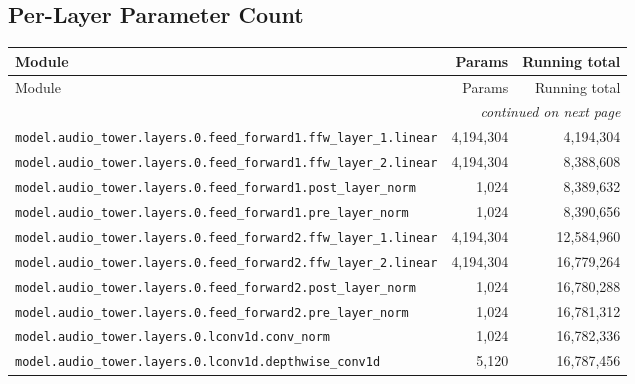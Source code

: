 \documentclass[10pt,a4paper]{article}
\theoremstyle{definition}
\begin{document}
\begin{appendices}
\section{Per-Layer Parameter Count}
\begin{longtable}{p{9.5cm}rr}
\toprule
Module & Params & Running total \\
\midrule
\endfirsthead
\toprule
Module & Params & Running total \\
\midrule
\endhead
\midrule \multicolumn{3}{r}{\textit{continued on next page}} \\
\endfoot
\bottomrule
\endlastfoot
\texttt{model.\allowbreak{}audio\_tower.\allowbreak{}layers.\allowbreak{}0.\allowbreak{}feed\_forward1.\allowbreak{}ffw\_layer\_1.\allowbreak{}linear} & 4,194,304 & 4,194,304 \\
\texttt{model.\allowbreak{}audio\_tower.\allowbreak{}layers.\allowbreak{}0.\allowbreak{}feed\_forward1.\allowbreak{}ffw\_layer\_2.\allowbreak{}linear} & 4,194,304 & 8,388,608 \\
\texttt{model.\allowbreak{}audio\_tower.\allowbreak{}layers.\allowbreak{}0.\allowbreak{}feed\_forward1.\allowbreak{}post\_layer\_norm} & 1,024 & 8,389,632 \\
\texttt{model.\allowbreak{}audio\_tower.\allowbreak{}layers.\allowbreak{}0.\allowbreak{}feed\_forward1.\allowbreak{}pre\_layer\_norm} & 1,024 & 8,390,656 \\
\texttt{model.\allowbreak{}audio\_tower.\allowbreak{}layers.\allowbreak{}0.\allowbreak{}feed\_forward2.\allowbreak{}ffw\_layer\_1.\allowbreak{}linear} & 4,194,304 & 12,584,960 \\
\texttt{model.\allowbreak{}audio\_tower.\allowbreak{}layers.\allowbreak{}0.\allowbreak{}feed\_forward2.\allowbreak{}ffw\_layer\_2.\allowbreak{}linear} & 4,194,304 & 16,779,264 \\
\texttt{model.\allowbreak{}audio\_tower.\allowbreak{}layers.\allowbreak{}0.\allowbreak{}feed\_forward2.\allowbreak{}post\_layer\_norm} & 1,024 & 16,780,288 \\
\texttt{model.\allowbreak{}audio\_tower.\allowbreak{}layers.\allowbreak{}0.\allowbreak{}feed\_forward2.\allowbreak{}pre\_layer\_norm} & 1,024 & 16,781,312 \\
\texttt{model.\allowbreak{}audio\_tower.\allowbreak{}layers.\allowbreak{}0.\allowbreak{}lconv1d.\allowbreak{}conv\_norm} & 1,024 & 16,782,336 \\
\texttt{model.\allowbreak{}audio\_tower.\allowbreak{}layers.\allowbreak{}0.\allowbreak{}lconv1d.\allowbreak{}depthwise\_conv1d} & 5,120 & 16,787,456 \\

\end{longtable}
\end{appendices}
\end{document}

